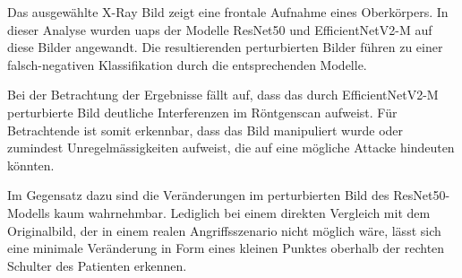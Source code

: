 Das ausgewählte X-Ray Bild zeigt eine frontale Aufnahme eines Oberkörpers. In dieser Analyse wurden \acrshort{uap}s der Modelle ResNet50 und EfficientNetV2-M auf diese Bilder angewandt. Die resultierenden perturbierten Bilder führen zu einer falsch-negativen Klassifikation durch die entsprechenden Modelle.

Bei der Betrachtung der Ergebnisse fällt auf, dass das durch EfficientNetV2-M perturbierte Bild deutliche Interferenzen im Röntgenscan aufweist. Für Betrachtende ist somit erkennbar, dass das Bild manipuliert wurde oder zumindest Unregelmässigkeiten aufweist, die auf eine mögliche Attacke hindeuten könnten.

Im Gegensatz dazu sind die Veränderungen im perturbierten Bild des ResNet50-Modells kaum wahrnehmbar. Lediglich bei einem direkten Vergleich mit dem Originalbild, der in einem realen Angriffsszenario nicht möglich wäre, lässt sich eine minimale Veränderung in Form eines kleinen Punktes oberhalb der rechten Schulter des Patienten erkennen.
\newpage